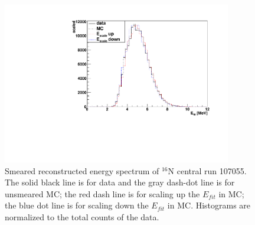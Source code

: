 \begin{figure}
	\centering
	\includegraphics[width=10cm]{SmearedEscale_N16.pdf}
	\caption[Smeared reconstructed energy spectrum of $^{16}$N central run 107055.]{Smeared reconstructed energy spectrum of $^{16}$N central run 107055. The solid black line is for data and the gray dash-dot line is for unsmeared MC; the red dash line is for scaling up the $E_{fit}$ in MC; the blue dot line is for scaling down the $E_{fit}$ in MC. Histograms are normalized to the total counts of the data.\label{fig:EscaleSmear}}
\end{figure}

